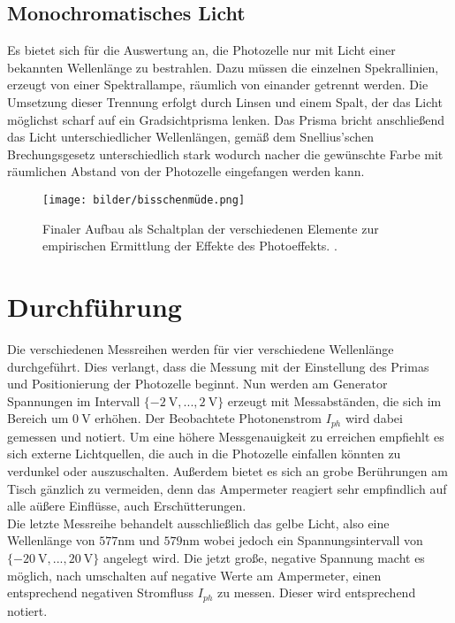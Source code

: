 \subsection{Monochromatisches Licht}
Es bietet sich für die Auswertung an, die Photozelle nur mit Licht einer bekannten Wellenlänge zu bestrahlen.
Dazu müssen die einzelnen Spekrallinien, erzeugt von einer Spektrallampe, räumlich von einander getrennt werden. 
Die Umsetzung dieser Trennung erfolgt durch Linsen und einem Spalt, der das Licht möglichst scharf auf ein Gradsichtprisma lenken.
Das Prisma bricht anschließend das Licht unterschiedlicher Wellenlängen, gemäß dem Snellius'schen Brechungsgesetz unterschiedlich 
stark wodurch nacher die gewünschte Farbe mit räumlichen Abstand von der Photozelle eingefangen werden kann.

\begin{figure}
    \centering
    \texttt{[image: bilder/bisschenmüde.png]}
    \caption{Finaler Aufbau als Schaltplan der verschiedenen Elemente zur empirischen Ermittlung der Effekte des Photoeffekts. \cite{skript}.} 
    \label{fig:müde}
\end{figure}
\section{Durchführung}
Die verschiedenen Messreihen werden für vier verschiedene Wellenlänge durchgeführt. %
Dies verlangt, dass die Messung mit der Einstellung des Primas und Positionierung der Photozelle beginnt. 
Nun werden am Generator Spannungen im Intervall $\{\SI{-2}{\volt},... ,\SI{2}{\volt}\}$ erzeugt mit Messabständen, die sich im Bereich um $\SI{0}{\volt}$ erhöhen.
Der Beobachtete Photonenstrom $I_{ph}$ wird dabei gemessen und notiert. Um eine höhere Messgenauigkeit zu erreichen empfiehlt es sich externe Lichtquellen, die
auch in die Photozelle einfallen könnten zu verdunkel oder auszuschalten. Außerdem bietet es sich an grobe Berührungen am Tisch gänzlich zu vermeiden, 
denn das Ampermeter reagiert sehr empfindlich auf alle aüßere Einflüsse, auch Erschütterungen.
\\
\newline
Die letzte Messreihe behandelt ausschließlich das gelbe Licht, also eine Wellenlänge von $577\si{\nano\meter}$ und $579 \si{\nano\meter}$ wobei jedoch ein 
Spannungsintervall von $\{\SI{-20}{\volt},... ,\SI{20}{\volt}\}$ angelegt wird. Die jetzt große, negative Spannung macht es möglich, nach umschalten auf negative Werte am Ampermeter,
einen entsprechend negativen Stromfluss $I_{ph}$ zu messen. Dieser wird entsprechend notiert. 
